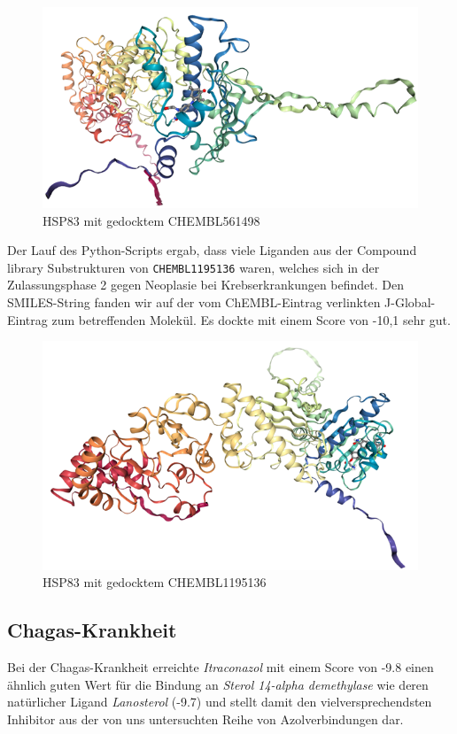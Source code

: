\documentclass[10pt]{article}
\begin{document}
    \begin{figure}[H]
        \centering
        \includegraphics[width=0.6\linewidth]{HSP83 mit gedocktem CHEMBL561498}
        \caption{HSP83 mit gedocktem CHEMBL561498}\label{fig:figure-hsp-CHEMBL561498}
    \end{figure}

    Der Lauf des Python-Scripts ergab, dass viele Liganden aus der Compound library Substrukturen von
    \texttt{CHEMBL1195136}
    waren, welches sich in der Zulassungsphase 2 gegen Neoplasie bei Krebserkrankungen befindet. Den SMILES-String
    fanden wir auf der vom ChEMBL-Eintrag verlinkten J-Global-Eintrag zum betreffenden Molekül.\cite{12} Es dockte
    mit einem
    Score von -10,1 sehr gut.

    \begin{figure}[H]
        \centering
        \includegraphics[width=0.6\linewidth]{HSP83 mit gedocktem CHEMBL1195136}
        \caption{HSP83 mit gedocktem CHEMBL1195136}\label{fig:figure-hsp-CHEMBL1195136}
    \end{figure}

    \subsection{Chagas-Krankheit}
    Bei der Chagas-Krankheit erreichte \emph{Itraconazol} mit einem Score von -9.8 einen ähnlich guten Wert für die
    Bindung
    an \emph{Sterol 14-alpha demethylase} wie deren natürlicher Ligand \emph{Lanosterol} (-9.7) und stellt damit den
    vielversprechendsten Inhibitor aus der von uns untersuchten Reihe von Azolverbindungen dar.
\end{document}
